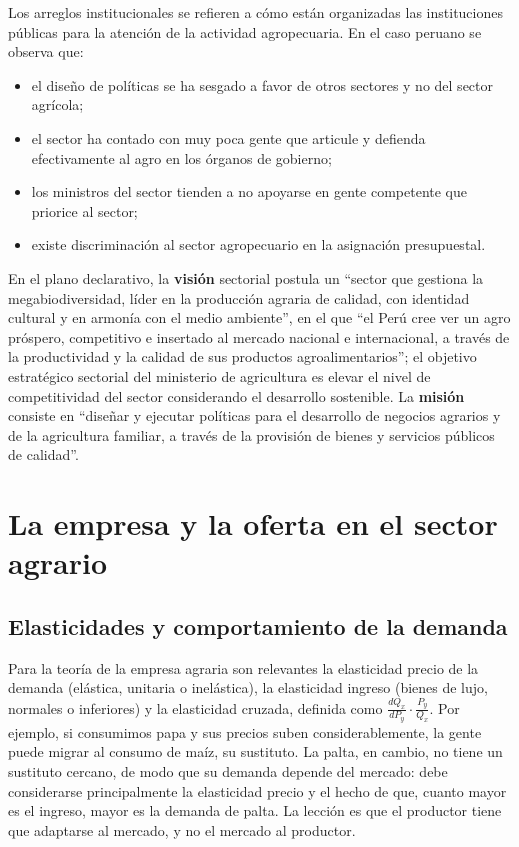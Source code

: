 \documentclass[
  man,
  floatsintext,
  longtable,
  a4paper,
  nolmodern,
  notxfonts,
  notimes,
  12pt,
  colorlinks=true,linkcolor=blue,citecolor=blue,urlcolor=blue]{apa7}
\providecommand{\tightlist}{%
  \setlength{\itemsep}{0pt}\setlength{\parskip}{0pt}}
\begin{document}
Los arreglos institucionales se refieren a cómo están organizadas las
instituciones públicas para la atención de la actividad agropecuaria. En
el caso peruano se observa que:

\begin{itemize}
\tightlist
\item
  el diseño de políticas se ha sesgado a favor de otros sectores y no
  del sector agrícola;
\item
  el sector ha contado con muy poca gente que articule y defienda
  efectivamente al agro en los órganos de gobierno;
\item
  los ministros del sector tienden a no apoyarse en gente competente que
  priorice al sector;
\item
  existe discriminación al sector agropecuario en la asignación
  presupuestal.
\end{itemize}

En el plano declarativo, la \textbf{visión} sectorial postula un
``sector que gestiona la megabiodiversidad, líder en la producción
agraria de calidad, con identidad cultural y en armonía con el medio
ambiente'', en el que ``el Perú cree ver un agro próspero, competitivo e
insertado al mercado nacional e internacional, a través de la
productividad y la calidad de sus productos agroalimentarios''; el
objetivo estratégico sectorial del ministerio de agricultura es elevar
el nivel de competitividad del sector considerando el desarrollo
sostenible. La \textbf{misión} consiste en ``diseñar y ejecutar
políticas para el desarrollo de negocios agrarios y de la agricultura
familiar, a través de la provisión de bienes y servicios públicos de
calidad''.

\section{La empresa y la oferta en el sector
agrario}\label{la-empresa-y-la-oferta-en-el-sector-agrario}

\subsection{Elasticidades y comportamiento de la
demanda}\label{elasticidades-y-comportamiento-de-la-demanda}

Para la teoría de la empresa agraria son relevantes la elasticidad
precio de la demanda (elástica, unitaria o inelástica), la elasticidad
ingreso (bienes de lujo, normales o inferiores) y la elasticidad
cruzada, definida como \(\frac{dQ_x}{dP_y}\cdot\frac{P_y}{Q_x}\). Por
ejemplo, si consumimos papa y sus precios suben considerablemente, la
gente puede migrar al consumo de maíz, su sustituto. La palta, en
cambio, no tiene un sustituto cercano, de modo que su demanda depende
del mercado: debe considerarse principalmente la elasticidad precio y el
hecho de que, cuanto mayor es el ingreso, mayor es la demanda de palta.
La lección es que el productor tiene que adaptarse al mercado, y no el
mercado al productor.
\end{document}
